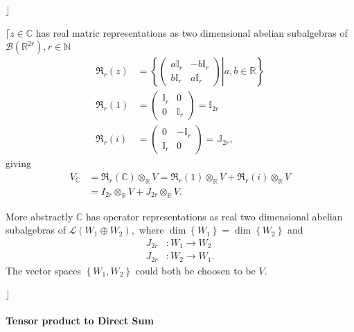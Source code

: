 \documentclass[aps,preprint]{revtex4}
\begin{document}
$\rfloor$

$\lceil z\in \mathbb{C}$ has real matric representations as two dimensional
abelian subalgebras of $\mathcal{B}\left( \mathbb{R}^{2r}\right) ,r\in 
\mathbb{N}$ 
\begin{align}
\mathfrak{R}_{r}\left( z\right) & =\left\{ \left. \left( 
\begin{array}{cc}
a\mathbb{I}_{r} & -b\mathbb{I}_{r} \\ 
b\mathbb{I}_{r} & a\mathbb{I}_{r}%
\end{array}%
\right) \right\vert a,b\in \mathbb{R}\right\} \\
\mathfrak{R}_{r}\left( 1\right) & =\left( 
\begin{array}{cc}
\mathbb{I}_{r} & 0 \\ 
0 & \mathbb{I}_{r}%
\end{array}%
\right) =\mathbb{I}_{2r} \\
\mathfrak{R}_{r}\left( i\right) & =\left( 
\begin{array}{cc}
0 & -\mathbb{I}_{r} \\ 
\mathbb{I}_{r} & 0%
\end{array}%
\right) =\mathbb{J}_{2r},
\end{align}%
giving%
\begin{align}
V_{\mathbb{C}}& =\mathfrak{R}_{r}\left( \mathbb{C}\right) \otimes _{\mathbb{R%
}}V=\mathfrak{R}_{r}\left( 1\right) \otimes _{\mathbb{R}}V+\mathfrak{R}%
_{r}\left( i\right) \otimes _{\mathbb{R}}V \\
& =I_{2r}\otimes _{\mathbb{R}}V+J_{2r}\otimes _{\mathbb{R}}V.
\end{align}

More abstractly $\mathbb{C}$ has operator representations as real two
dimensional abelian subalgebras of $\mathcal{L}\left( W_{1}\oplus
W_{2}\right) ,$ where $\dim\left\{ W_{1}\right\} =\dim\left\{ W_{2}\right\} $
and 
\begin{align}
J_{2r} & :W_{1}\rightarrow W_{2} \\
J_{2r} & :W_{2}\rightarrow W_{1}.
\end{align}
The vector spaces $\left\{ W_{1},W_{2}\right\} $ could both be choosen to be 
$V.$

$\rfloor$

\paragraph{Tensor product to Direct Sum}
\end{document}
